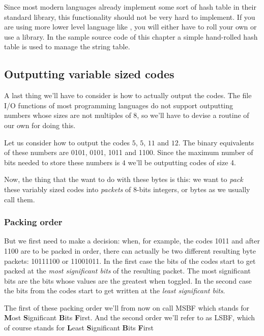 \begin{refsection}
Since most modern languages already implement some sort of hash table
in their standard library, this functionality should not be very hard
to implement. If you are using more lower level language like \C, you
will either have to roll your own or use a library. In the sample \C
source code of this chapter a simple hand-rolled hash table
is used to manage the string table.

\subsection{Outputting variable sized codes}

A last thing we'll have to consider is how to actually output the
codes. The file I/O functions of most programming languages do not
support outputting numbers whose sizes are not multiples of 8, so
we'll have to devise a routine of our own for doing this.

Let us consider how to output the codes $5$, $5$, $11$ and $12$. The
binary equivalents of these numbers are 0101, 0101, 1011 and
1100. Since the maximum number of bits needed to store these numbers
is $4$ we'll be outputting codes of size 4.

Now, the thing that the want to do with these bytes is this: we want
to \textit{pack} these variably sized codes into
\textit{packets} of 8-bits integers, or bytes as we
usually call them.

\subsubsection{Packing order}

But we first need to make a decision: when, for example, the codes
1011 and after 1100 are to be packed in order, there can actually be two
different resulting byte packets: 10111100 or 11001011. In the first
case the bits of the codes start to get packed at the \textit{most
  significant bits} of the resulting packet.  The most significant
bits are the bits whose values are the greatest when toggled. In the
second case the bits from the codes start to get written at the
\textit{least significant bits}.

The first of these packing order we'll from now on call
MSBF which stands for \textbf{M}ost \textbf{S}ignificant
\textbf{B}its \textbf{F}irst. And the second order we'll refer to as
LSBF, which of course stands for \textbf{L}east
\textbf{S}ignificant \textbf{B}its \textbf{F}irst


\end{refsection}
